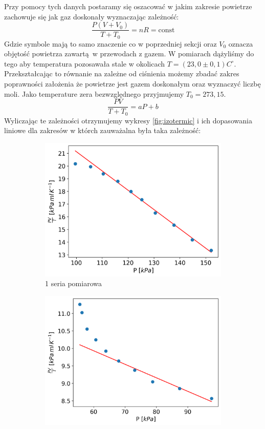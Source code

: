\documentclass[12pt]{article}
\begin{document}
Przy pomocy tych danych postaramy się oszacować w jakim zakresie powietrze zachowuje się jak gaz doskonały wyznaczając zależność:
\[
    \frac{P(V + V_0)}{T + T_0} = nR = \text{const}
\]
Gdzie symbole mają to samo znaczenie co w poprzedniej sekcji oraz \(V_0\) oznacza objętość powietrza zawartą w przewodach z gazem. W pomiarach dążyliśmy do tego aby temperatura pozosawała stale w okolicach \(T = (23{,}0 \pm 0{,}1)C^\circ\). Przekształcając to równanie na zależne od ciśnienia możemy zbadać zakres poprawności założenia że powietrze jest gazem doskonałym oraz wyznaczyć liczbę moli. Jako temperature zera bezwzględnego\cite{zero} przyjmujemy \(T_0 = 273{,}15\).
\[
    \frac{PV}{T + T_0} = aP + b
\]
Wyliczając te zależności otrzymujemy wykresy \ref{fig:izotermic} i ich dopasowania liniowe dla zakresów w którch zauważalna była taka zależność:
\begin{figure}[H]
    \centering
    \begin{subfigure}{0.47\textwidth}
        \includegraphics[width=\linewidth]{izotermic_0}
        \caption{1 seria pomiarowa}
    \end{subfigure}\hfill
    \begin{subfigure}{0.47\textwidth}
        \includegraphics[width=\linewidth]{izotermic_1}

\end{subfigure}
\end{figure}
\end{document}
